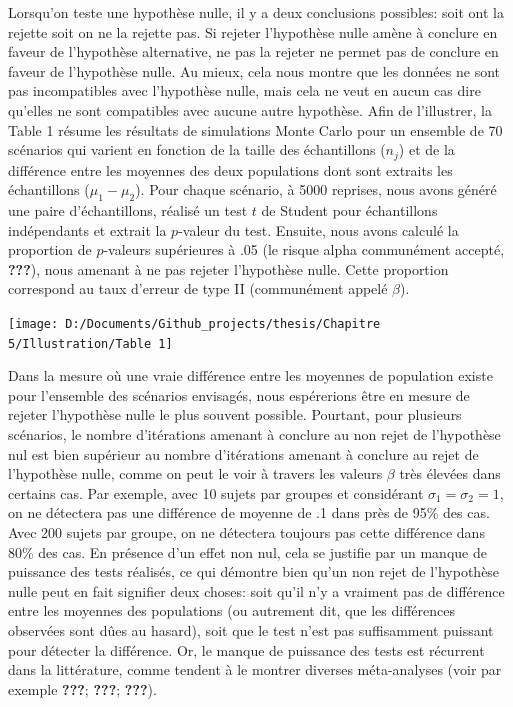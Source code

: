 \documentclass[
  english,
  man]{apa6}
\begin{document}
Lorsqu'on teste une hypothèse nulle, il y a deux conclusions possibles: soit ont la rejette soit on ne la rejette pas. Si rejeter l'hypothèse nulle amène à conclure en faveur de l'hypothèse alternative, ne pas la rejeter ne permet pas de conclure en faveur de l'hypothèse nulle. Au mieux, cela nous montre que les données ne sont pas incompatibles avec l'hypothèse nulle, mais cela ne veut en aucun cas dire qu'elles ne sont compatibles avec aucune autre hypothèse. Afin de l'illustrer, la Table 1 résume les résultats de simulations Monte Carlo pour un ensemble de 70 scénarios qui varient en fonction de la taille des échantillons (\(n_j\)) et de la différence entre les moyennes des deux populations dont sont extraits les échantillons (\(\mu_1-\mu_2\)). Pour chaque scénario, à 5000 reprises, nous avons généré une paire d'échantillons, réalisé un test \(t\) de Student pour échantillons indépendants et extrait la \(p\)-valeur du test. Ensuite, nous avons calculé la proportion de \(p\)-valeurs supérieures à .05 (le risque alpha communément accepté, {\textbf{???}}), nous amenant à ne pas rejeter l'hypothèse nulle. Cette proportion correspond au taux d'erreur de type II (communément appelé \(\beta\)).

\begin{center}\texttt{[image: D:/Documents/Github\_projects/thesis/Chapitre 5/Illustration/Table 1]} \end{center}

Dans la mesure où une vraie différence entre les moyennes de population existe pour l'ensemble des scénarios envisagés, nous espérerions être en mesure de rejeter l'hypothèse nulle le plus souvent possible. Pourtant, pour plusieurs scénarios, le nombre d'itérations amenant à conclure au non rejet de l'hypothèse nul est bien supérieur au nombre d'itérations amenant à conclure au rejet de l'hypothèse nulle, comme on peut le voir à travers les valeurs \(\beta\) très élevées dans certains cas. Par exemple, avec 10 sujets par groupes et considérant \(\sigma_1=\sigma_2=1\), on ne détectera pas une différence de moyenne de .1 dans près de 95\% des cas. Avec 200 sujets par groupe, on ne détectera toujours pas cette différence dans 80\% des cas. En présence d'un effet non nul, cela se justifie par un manque de puissance des tests réalisés, ce qui démontre bien qu'un non rejet de l'hypothèse nulle peut en fait signifier deux choses: soit qu'il n'y a vraiment pas de différence entre les moyennes des populations (ou autrement dit, que les différences observées sont dûes au hasard), soit que le test n'est pas suffisamment puissant pour détecter la différence. Or, le manque de puissance des tests est récurrent dans la littérature, comme tendent à le montrer diverses méta-analyses (voir par exemple {\textbf{???}}; {\textbf{???}}; {\textbf{???}}).
\end{document}
